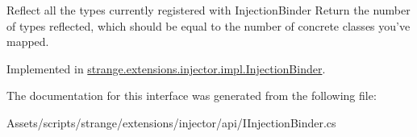 Reflect all the types currently registered with Injection\-Binder Return the number of types reflected, which should be equal to the number of concrete classes you've mapped. 



Implemented in \hyperlink{classstrange_1_1extensions_1_1injector_1_1impl_1_1_injection_binder_a5a03e345237a56af33953e215852526b}{strange.\-extensions.\-injector.\-impl.\-Injection\-Binder}.



The documentation for this interface was generated from the following file\-:\begin{DoxyCompactItemize}
\item 
Assets/scripts/strange/extensions/injector/api/I\-Injection\-Binder.\-cs\end{DoxyCompactItemize}
